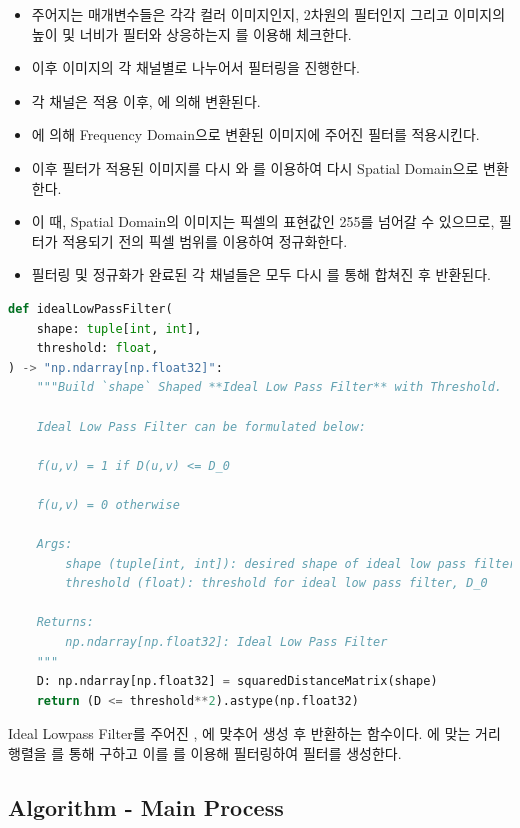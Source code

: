 \documentclass{report}
\begin{document}
\begin{itemize}
    \item 주어지는 매개변수들은 각각 컬러 이미지인지, 2차원의 필터인지 그리고 이미지의 높이 및 너비가 필터와 상응하는지 를 이용해 체크한다.
    \item 이후 이미지의 각 채널별로 나누어서 필터링을 진행한다.
    \item 각 채널은  적용 이후, 에 의해 변환된다.
    \item {}에 의해 Frequency Domain으로 변환된 이미지에 주어진 필터를 적용시킨다.
    \item 이후 필터가 적용된 이미지를 다시 와 를 이용하여 다시 Spatial Domain으로 변환한다.
    \item 이 때, Spatial Domain의 이미지는 픽셀의 표현값인 255를 넘어갈 수 있으므로, 필터가 적용되기 전의 픽셀 범위를 이용하여 정규화한다.
    \item 필터링 및 정규화가 완료된 각 채널들은 모두 다시 를 통해 합쳐진 후 반환된다.
\end{itemize}

\begin{lstlisting}[language=Python, caption=Primitive - idealLowPassFilter, firstnumber=78]
def idealLowPassFilter(
    shape: tuple[int, int],
    threshold: float,
) -> "np.ndarray[np.float32]":
    """Build `shape` Shaped **Ideal Low Pass Filter** with Threshold.

    Ideal Low Pass Filter can be formulated below:

    f(u,v) = 1 if D(u,v) <= D_0

    f(u,v) = 0 otherwise

    Args:
        shape (tuple[int, int]): desired shape of ideal low pass filter
        threshold (float): threshold for ideal low pass filter, D_0

    Returns:
        np.ndarray[np.float32]: Ideal Low Pass Filter
    """
    D: np.ndarray[np.float32] = squaredDistanceMatrix(shape)
    return (D <= threshold**2).astype(np.float32)
\end{lstlisting}

Ideal Lowpass Filter를 주어진 , 에 맞추어 생성 후 반환하는 함수이다.
에 맞는 거리 행렬을 를 통해 구하고 이를 를 이용해 필터링하여 필터를 생성한다.

\subsection*{Algorithm - Main Process}
\end{document}
